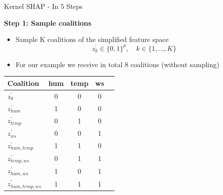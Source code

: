 \documentclass[11pt,compress,t,notes=noshow, aspectratio=169, xcolor=table]{beamer}
\begin{document}
\begin{vbframe}{Kernel SHAP - In 5 Steps}


\textbf{Step 1: Sample coalitions}
\begin{itemize}
    \item Sample K coalitions of the simplified feature space
    $$z_{k}^{\prime} \in\{0,1\}^{p}, \quad k \in\{1, \ldots, K\}$$
    \item For our example we receive in total 8 coalitions (without sampling)
\end{itemize}

\begin{table}[]
    \centering
     \begin{tabular}{l |cccc}
  Coalition &  hum & temp & ws \\
  \hline 
  $z^{\prime}_{0}$ & 0 & 0 & 0  \\
   $z^{\prime}_{hum}$ & 1 & 0 & 0  \\
    $z^{\prime}_{temp}$ & 0 & 1 & 0  \\
     $z^{\prime}_{ws}$ & 0 & 0 & 1  \\
     $z^{\prime}_{hum, temp}$ & 1 & 1 & 0  \\
     $z^{\prime}_{temp, ws}$ & 0 & 1 & 1  \\
     $z^{\prime}_{hum, ws}$ & 1 & 0 & 1  \\
  $z^{\prime}_{hum, temp, ws}$ & 1 & 1 & 1  \\
  
 
  \end{tabular}
\end{table}

\end{vbframe}
\end{document}
